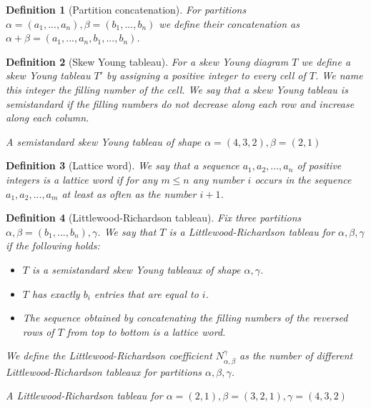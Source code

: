 \documentclass[letterpaper,11pt]{article}
\newtheorem{definition}{Definition}
\begin{document}
	\begin{definition}[Partition concatenation]
		For partitions $\alpha=(a_1, ..., a_n), \beta=(b_1, ..., b_n)$ we define their concatenation as $\alpha + \beta = (a_1, ..., a_n, b_1, ..., b_n)$.
	\end{definition}
	
	\begin{definition}[Skew Young tableau]
		For a skew Young diagram $T$ we define a skew Young tableau $T'$ by assigning a positive integer to every cell of $T$. We name this integer the filling number of the cell. We say that a skew Young tableau is semistandard if the filling numbers do not decrease along each row and increase along each column.
		
		{
			 \newline
			A semistandard skew Young tableau of shape $\alpha = (4,3,2), \beta=(2,1)$ \newline\par
		}
	\end{definition}
	
	\begin{definition}[Lattice word]
		We say that a sequence $a_1, a_2, ..., a_n$ of positive integers is a lattice word if for any $m \le n$ any number $i$ occurs in the sequence $a_1, a_2, ..., a_m$ at least as often as the number $i+1$.
	\end{definition}
	
	\begin{definition}[Littlewood-Richardson tableau]
		Fix three partitions $\alpha, \beta = (b_1, ..., b_n), \gamma$. We say that $T$ is a Littlewood-Richardson tableau for $\alpha, \beta, \gamma$ if the following holds:
		\begin{itemize}
			\item $T$ is a semistandard skew Young tableaux of shape $\alpha, \gamma$.
			\item $T$ has exactly $b_i$ entries that are equal to $i$.
			\item The sequence obtained by concatenating the filling numbers of the reversed rows of $T$ from top to bottom is a lattice word.
		\end{itemize}
		We define the Littlewood-Richardson coefficient $N_{\alpha, \beta}^\gamma$ as the number of different Littlewood-Richardson tableaux for partitions $\alpha, \beta, \gamma$.
		
		{
			 \newline
			A Littlewood-Richardson tableau for $\alpha = (2,1), \beta=(3,2,1), \gamma=(4,3,2)$ \newline\par
		}
	\end{definition}
	
\end{document}

